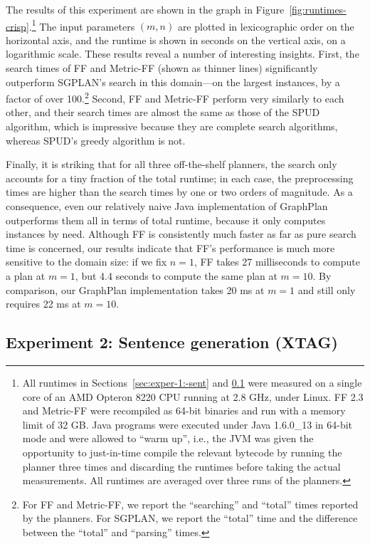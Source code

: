 The results of this experiment are shown in the graph in
Figure~\ref{fig:runtimes-crisp}.\footnote{All runtimes in
  Sections~\ref{sec:exper-1:-sent} and \ref{sec:exper-2:-sent-xtag}
  were measured on a single core of an AMD Opteron 8220 CPU running at
  2.8 GHz, under Linux. FF 2.3 and Metric-FF were recompiled as 64-bit
  binaries and run with a memory limit of 32 GB. Java programs were
  executed under Java 1.6.0\_13 in 64-bit mode and were allowed to
  ``warm up'', i.e., the JVM was given the opportunity to just-in-time
  compile the relevant bytecode by running the planner three times and
  discarding the runtimes before taking the actual measurements. All
  runtimes are averaged over three runs of the planners.} The input
parameters $(m,n)$ are plotted in lexicographic order on the
horizontal axis, and the runtime is shown in seconds on the vertical
axis, on a logarithmic scale. These results reveal a number of
interesting insights. First, the search times of FF and Metric-FF
(shown as thinner lines) significantly outperform SGPLAN's search in
this domain---on the largest instances, by a factor of over
100.\footnote{For FF and Metric-FF, we report the ``searching'' and
  ``total'' times reported by the planners. For SGPLAN, we report the
  ``total'' time and the difference between the ``total'' and
  ``parsing'' times.} Second, FF and Metric-FF perform very similarly
to each other, and their search times are almost the same as those of
the SPUD algorithm, which is impressive because they are complete
search algorithms, whereas SPUD's greedy algorithm is not.

Finally, it is striking that for all three off-the-shelf planners, the
search only accounts for a tiny fraction of the total runtime; in each
case, the preprocessing times are higher than the search times by one
or two orders of magnitude. As a consequence, even our relatively
naive Java implementation of GraphPlan outperforms them all in terms
of total runtime, because it only computes instances by need. Although
FF is consistently much faster as far as pure search time is
concerned, our results indicate that FF's performance is much more
sensitive to the domain size: if we fix $n=1$, FF takes 27
milliseconds to compute a plan at $m=1$, but 4.4 seconds to compute
the same plan at $m=10$. By comparison, our GraphPlan implementation
takes 20 ms at $m=1$ and still only requires 22 ms at
$m=10$.



\subsection{Experiment 2: Sentence generation (XTAG)}
\label{sec:exper-2:-sent-xtag}

